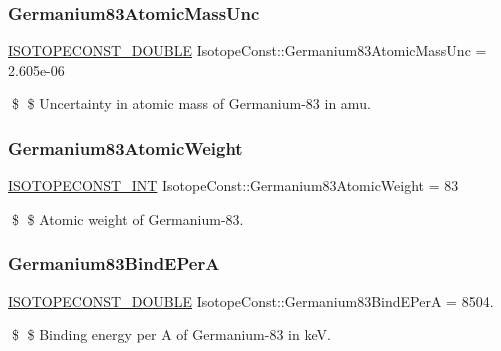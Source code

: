 \subsubsection{\texorpdfstring{Germanium83\+Atomic\+Mass\+Unc}{Germanium83AtomicMassUnc}}
{\footnotesize\ttfamily \mbox{\hyperlink{group___isotope_const-_macros_ga8f45a7272ce02c0b4c65c44636ed719a}{I\+S\+O\+T\+O\+P\+E\+C\+O\+N\+S\+T\+\_\+\+D\+O\+U\+B\+LE}} Isotope\+Const\+::\+Germanium83\+Atomic\+Mass\+Unc = 2.\+605e-\/06}

\$ \$ Uncertainty in atomic mass of Germanium-\/83 in amu. \mbox{\label{group___isotope_const-_germanium-_ge83_ga18cbcdfb5d97fdc12ffc96e63f4b6179}} 
\subsubsection{\texorpdfstring{Germanium83\+Atomic\+Weight}{Germanium83AtomicWeight}}
{\footnotesize\ttfamily \mbox{\hyperlink{group___isotope_const-_macros_ga5f18360b3e99483a35c32d789e62621c}{I\+S\+O\+T\+O\+P\+E\+C\+O\+N\+S\+T\+\_\+\+I\+NT}} Isotope\+Const\+::\+Germanium83\+Atomic\+Weight = 83}

\$ \$ Atomic weight of Germanium-\/83. \mbox{\label{group___isotope_const-_germanium-_ge83_ga1083e8cd780e976fa48b7a8b30fcbf6c}} 
\subsubsection{\texorpdfstring{Germanium83\+Bind\+E\+PerA}{Germanium83BindEPerA}}
{\footnotesize\ttfamily \mbox{\hyperlink{group___isotope_const-_macros_ga8f45a7272ce02c0b4c65c44636ed719a}{I\+S\+O\+T\+O\+P\+E\+C\+O\+N\+S\+T\+\_\+\+D\+O\+U\+B\+LE}} Isotope\+Const\+::\+Germanium83\+Bind\+E\+PerA = 8504.}

\$ \$ Binding energy per A of Germanium-\/83 in keV. \mbox{\label{group___isotope_const-_germanium-_ge83_ga8b15bbe9a18a2fa27ad520da3089dd59}} 
